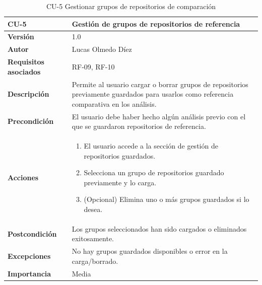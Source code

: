 \clearpage
\begin{table}[p]
    \centering
    \begin{tabularx}{\linewidth}{ p{} p{} }
        \toprule
        \textbf{CU-5} & Gestión de grupos de repositorios de referencia \\
        \midrule
        \textbf{Versión} & 1.0 \\
        \textbf{Autor} & Lucas Olmedo Díez \\
        \textbf{Requisitos asociados} & RF-09, RF-10 \\
        \textbf{Descripción} & Permite al usuario cargar o borrar grupos de repositorios previamente guardados para usarlos como referencia comparativa en los análisis. \\
        \textbf{Precondición} & El usuario debe haber hecho algún análisis previo con el que se guardaron repositorios de referencia. \\
        \textbf{Acciones} &
        \begin{enumerate}
            \def\labelenumi{\arabic{enumi}.}
            \tightlist
            \item El usuario accede a la sección de gestión de repositorios guardados.
            \item Selecciona un grupo de repositorios guardado previamente y lo carga.
            \item (Opcional) Elimina uno o más grupos guardados si lo desea.
        \end{enumerate}\\
        \textbf{Postcondición} & Los grupos seleccionados han sido cargados o eliminados exitosamente. \\
        \textbf{Excepciones} & No hay grupos guardados disponibles o error en la carga/borrado. \\
        \textbf{Importancia} & Media \\
        \bottomrule
    \end{tabularx}
    \caption{CU-5 Gestionar grupos de repositorios de comparación}
\end{table}

